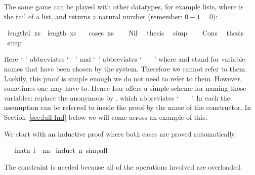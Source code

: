 \begin{isabellebody}
\begin{isamarkuptext}
The same game can be played with other datatypes, for example lists,
where  is the tail of a list, and  returns a
natural number (remember: $0-1=0$):%
\end{isamarkuptext}%
\isamarkuptrue%
\isamarkupfalse%
\ {\isachardoublequote}length{\isacharparenleft}tl\ xs{\isacharparenright}\ {\isacharequal}\ length\ xs\ {\isacharminus}\ {}{\isachardoublequote}\isanewline
\isamarkupfalse%
\ {\isacharparenleft}cases\ xs{\isacharparenright}\isanewline
\ \ \isamarkupfalse%
\ Nil\ \isamarkupfalse%
\ {\isacharquery}thesis\ \isamarkupfalse%
\ simp\isanewline
\isamarkupfalse%
\isanewline
\ \ \isamarkupfalse%
\ Cons\ \isamarkupfalse%
\ {\isacharquery}thesis\ \isamarkupfalse%
\ simp\isanewline
\isamarkupfalse%
\isamarkupfalse%
%
\begin{isamarkuptext}%
\noindent Here `~' abbreviates
`~~' and
`~'
abbreviates `~\isa{{\isacharquery}\ {\isacharquery}{\isacharquery}}
~~'
where \isa{{\isacharquery}} and \isa{{\isacharquery}{\isacharquery}}
stand for variable names that have been chosen by the system.
Therefore we cannot refer to them.
Luckily, this proof is simple enough we do not need to refer to them.
However, sometimes one may have to. Hence Isar offers a simple scheme for
naming those variables: replace the anonymous  by
, which abbreviates `~
~~'.
In each  the assumption can be
referred to inside the proof by the name of the constructor. In
Section~\ref{sec:full-Ind} below we will come across an example
of this.%
\end{isamarkuptext}%
\isamarkuptrue%
%
\isamarkuptrue%
%
\begin{isamarkuptext}%
We start with an inductive proof where both cases are proved automatically:%
\end{isamarkuptext}%
\isamarkuptrue%
\ {\isachardoublequote}{}\ {\isacharasterisk}\ {\isacharparenleft}{\isasymSum}i{\isacharcolon}{\isacharcolon}nat{\isasymle}n{\isachardot}\ i{\isacharparenright}\ {\isacharequal}\ n{\isacharasterisk}{\isacharparenleft}n{\isacharplus}{}{\isacharparenright}{\isachardoublequote}\isanewline
\isamarkupfalse%
\ {\isacharparenleft}induct\ n{\isacharcomma}\ simp{\isacharunderscore}all{\isacharparenright}\isamarkupfalse%
%
\begin{isamarkuptext}%
\noindent The constraint  is needed because all of
the operations involved are overloaded.


\end{isamarkuptext}
\end{isabellebody}
